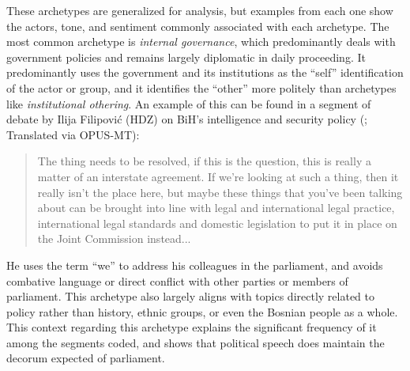 These archetypes are generalized for analysis, but examples from each one show the actors, tone, and sentiment commonly associated with each archetype. The most common archetype is \textit{internal governance}, which predominantly deals with government policies and remains largely diplomatic in daily proceeding. It predominantly uses the government and its institutions as the ``self'' identification of the actor or group, and it identifies the ``other'' more politely than archetypes like \textit{institutional othering}. An example of this can be found in a segment of debate by Ilija Filipovi{\'c} (\ac{HDZ}) on \ac{BiH}'s intelligence and security policy (\citealp{mochtak2022}; Translated via OPUS-MT):
\begin{quote}
The thing needs to be resolved, if this is the question, this is really a matter of an interstate agreement. If we're looking at such a thing, then it really isn't the place here, but maybe these things that you've been talking about can be brought into line with legal and international legal practice, international legal standards and domestic legislation to put it in place on the Joint Commission instead...
\end{quote}
He uses the term ``we'' to address his colleagues in the parliament, and avoids combative language or direct conflict with other parties or members of parliament. This archetype also largely aligns with topics directly related to policy rather than history, ethnic groups, or even the Bosnian people as a whole. This context regarding this archetype explains the significant frequency of it among the segments coded, and shows that political speech does maintain the decorum expected of parliament.

